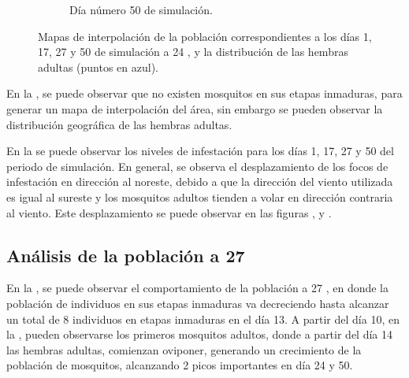 \begin{figure}[!htbp]
\begin{subfigure}[b]{0.45\textwidth}
            \caption{\label{fig:niveles-infestacion-24-d}Día número 50 de simulación.}
    \end{subfigure}

    \caption{\label{fig:niveles-infestacion-24} Mapas de interpolación de la población correspondientes a los días 1, 17, 27 y 50 de simulación a 24 \textcelsius, y la distribución de las hembras adultas (puntos en azul). }
\end{figure}

En la , se puede observar que no existen mosquitos en sus
etapas inmaduras, para generar un mapa de interpolación del área, sin embargo se pueden observar la
distribución geográfica de las hembras adultas.

En la  se puede observar los niveles de infestación para los
días 1, 17, 27 y 50 del periodo de simulación. En general, se observa el desplazamiento de los
focos de infestación en dirección al noreste, debido a que la dirección del viento utilizada es
igual al sureste y los mosquitos adultos tienden a volar en dirección contraria al viento. Este
desplazamiento se puede observar en las figuras
 ,  y
.

\subsection{Análisis de la población a 27\textcelsius}
En la , se puede observar el comportamiento de la población a
27 \textcelsius, en donde la población de individuos en sus etapas inmaduras va decreciendo hasta
alcanzar un total de 8 individuos en etapas inmaduras en el día 13. A partir del día 10, en la
, pueden observarse los primeros mosquitos adultos, donde a
partir del día 14 las hembras adultas, comienzan oviponer, generando un crecimiento de la
población de mosquitos, alcanzando 2 picos importantes en día 24 y 50.

